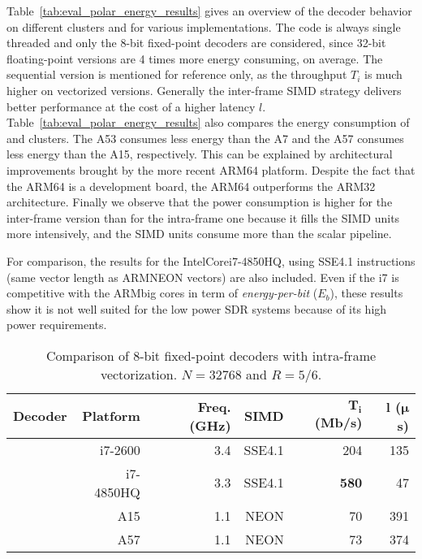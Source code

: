 Table~\ref{tab:eval_polar_energy_results} gives an overview of the decoder
behavior on different clusters and for various implementations. The code is
always single threaded and only the 8-bit fixed-point decoders are considered,
since 32-bit floating-point versions  are 4 times more energy consuming, on
average. The sequential version is mentioned for reference only, as the
throughput $T_i$ is much higher on vectorized versions. Generally the
inter-frame SIMD strategy delivers better performance at the cost of a higher
latency $l$. Table~\ref{tab:eval_polar_energy_results} also compares the energy
consumption of \little and \big clusters. The A53 consumes less energy than the
A7 and the A57 consumes less energy than the A15, respectively. This can be
explained by architectural improvements brought by the more recent ARM64
platform. Despite the fact that the ARM64 is a development board, the ARM64
outperforms the ARM32 architecture. Finally we observe that the power
consumption is higher for the inter-frame version than for the intra-frame one
because it fills the SIMD units more intensively, and the SIMD units consume
more than the scalar pipeline.

For comparison, the results for the Intel\R Core\TM i7-4850HQ, using SSE4.1
instructions (same vector length as ARM\R NEON vectors) are also included. Even
if the i7 is competitive with the ARM\R big cores in term of
\textit{energy-per-bit} ($E_b$), these results show it is not well suited for
the low power SDR systems because of its high power requirements.

\begin{table}[htp]
  \caption{Comparison of 8-bit fixed-point decoders with intra-frame
    vectorization. $N = 32768$ and $R = 5/6$.}
  \label{tab:eval_polar_energy_comparison}
  \begin{center}
  \begin{tabular}{r r r r r r}
    \textbf{Decoder} &
    \textbf{Platform} &
    \textbf{Freq. (GHz)} &
    \textbf{SIMD} &
    $\boldsymbol{T_i}$ \textbf{(Mb/s)} &
    $\boldsymbol{l}$   \textbf{($\boldsymbol{\mu}$s)}\\
    \hline
    \hline
    \cite{Giard2014}     & i7-2600   & 3.4 & SSE4.1 &         204  &  135 \\ %
    \cite{Cassagne2016b} & i7-4850HQ & 3.3 & SSE4.1 & \textbf{580} &   47 \\ %
    \cite{Cassagne2016b} & A15       & 1.1 & NEON   &          70  &  391 \\ %
    \cite{Cassagne2016b} & A57       & 1.1 & NEON   &          73  &  374 \\
  \end{tabular}
  \end{center}
\end{table}

